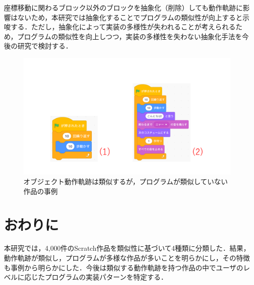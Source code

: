 \documentclass[T,J]{fose} %
\newcommand{\todo}[1]{\colorbox{yellow}{{\bf TODO}:}{\color{red} {\textbf{[#1]}}}}
\begin{document}

座標移動に関わるブロック以外のブロックを抽象化（削除）しても動作軌跡に影響はないため，本研究では抽象化することでプログラムの類似性が向上すると示唆する．ただし，抽象化によって実装の多様性が失われることが考えられるため，プログラムの類似性を向上しつつ，実装の多様性を失わない抽象化手法を今後の研究で検討する．

\begin{figure}[t]
	\centering
	\includegraphics[width=1.0\linewidth]{Okamoto_fig/pattern2-1.pdf}
	\caption{オブジェクト動作軌跡は類似するが，プログラムが類似していない作品の事例}
   \vspace{-2mm}
	\label{fig:pattern2-1}
\end{figure}



\vspace{-7pt}
\section{おわりに}\label{sec:con}

本研究では，4,000件のScratch作品を類似性に基づいて4種類に分類した．結果，動作軌跡が類似し，プログラムが多様な作品が多いことを明らかにし，その特徴も事例から明らかにした．今後は類似する動作軌跡を持つ作品の中でユーザのレベルに応じたプログラムの実装パターンを特定する．





\end{document}
